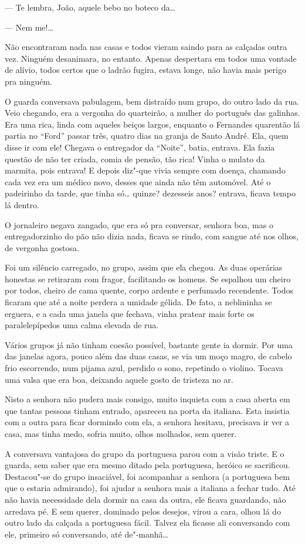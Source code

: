 --- Te lembra, João, aquele bebo no boteco da\ldots{}

--- Nem me!\ldots{}

Não encontraram nada nas casas e todos vieram saindo para as calçadas
outra vez. Ninguém desanimara, no entanto. Apenas despertara em todos
uma vontade de alívio, todos certos que o ladrão fugira, estava longe,
não havia mais perigo pra ninguém.

O guarda conversava pabulagem, bem distraído num grupo, do outro lado da
rua. Veio chegando, era a vergonha do quarteirão, a mulher do português
das galinhas. Era uma rica, linda com aqueles beiços largos, enquanto o
Fernandes quarentão lá partia no ``Ford'' passar três, quatro dias na
granja de Santo André. Ela, quem disse ir com ele! Chegava o entregador
da ``Noite'', batia, entrava. Ela fazia questão de não ter criada, comia
de pensão, tão rica! Vinha o mulato da marmita, pois entrava! E depois
diz"-que vivia sempre com doença, chamando cada vez era um médico novo,
desses que ainda não têm automóvel. Até o padeirinho da tarde, que tinha
só\ldots{} quinze? dezesseis anos? entrava, ficava tempo lá dentro.

O jornaleiro negava zangado, que era só pra conversar, senhora boa, mas
o entregadorzinho do pão não dizia nada, ficava se rindo, com sangue até
nos olhos, de vergonha gostosa.

Foi um silêncio carregado, no grupo, assim que ela chegou. As duas
operárias honestas se retiraram com fragor, facilitando os homens. Se
espalhou um cheiro por todos, cheiro de cama quente, corpo ardente e
perfumado recendente. Todos ficaram que até a noite perdera a umidade
gélida. De fato, a neblininha se erguera, e a cada uma janela que
fechava, vinha pratear mais forte os paralelepípedos uma calma elevada
de rua.

Vários grupos já não tinham coesão possível, bastante gente ia dormir.
Por uma das janelas agora, pouco além das duas casas, se via um moço
magro, de cabelo frio escorrendo, num pijama azul, perdido o sono,
repetindo o violino. Tocava uma valsa que era boa, deixando aquele gosto
de tristeza no ar.

Nisto a senhora não pudera mais consigo, muito inquieta com a casa
aberta em que tantas pessoas tinham entrado, apareceu na porta da
italiana. Esta insistia com a outra para ficar dormindo com ela, a
senhora hesitava, precisava ir ver a casa, mas tinha medo, sofria muito,
olhos molhados, sem querer.

A conversava vantajosa do grupo da portuguesa parou com a visão triste.
E o guarda, sem saber que era mesmo ditado pela portuguesa, heróico se
sacrificou. Destacou"-se do grupo insaciável, foi acompanhar a senhora (a
portuguesa bem que o estaria admirando), foi ajudar a senhora mais a
italiana a fechar tudo. Até não havia necessidade dela dormir na casa da
outra, ele ficava guardando, não arredava pé. E sem querer, dominado
pelos desejos, virou a cara, olhou lá do outro lado da calçada a
portuguesa fácil. Talvez ela ficasse ali conversando com ele, primeiro
só conversando, até de"-manhã\ldots{}

